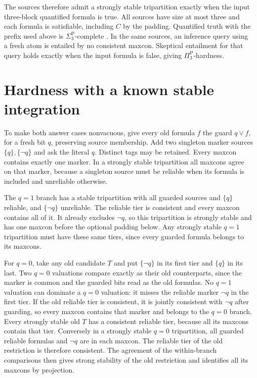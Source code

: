 \documentclass[11pt,a4paper]{amsart}
\begin{document}
The sources therefore admit a strongly stable tripartition exactly
when the input three-block quantified formula is true. All sources
have size at most three and each formula is satisfiable, including
\(C\) by the padding. Quantified truth with the prefix used above
is \(\Sigma_3^{\mathrm P}\)-complete \cite{stockmeyer}. In the
same sources, an inference query using a fresh atom is entailed by
no consistent maxcon. Skeptical entailment for that query holds
exactly when the input formula is false, giving
\(\Pi_3^{\mathrm P}\)-hardness.

\section{Hardness with a known stable integration}

To make both answer cases nonvacuous, give every old formula \(f\)
the guard \(q\lor f\), for a fresh bit \(q\), preserving source
membership. Add two singleton marker sources \(\{q\},\{\neg q\}\)
and ask the literal \(q\). Distinct tags may be retained.
Every maxcon contains exactly one marker. In a strongly stable
tripartition all maxcons agree on that marker, because a singleton
source must be reliable when its formula is included and
unreliable otherwise.

The \(q=1\) branch has a stable tripartition with all guarded
sources and \(\{q\}\) reliable, and \(\{\neg q\}\) unreliable.
The reliable tier is consistent and every maxcon contains all
of it. It already excludes \(\neg q\), so this tripartition is
strongly stable and has one maxcon before the optional padding
below. Any strongly stable \(q=1\) tripartition must have these
same tiers, since every guarded formula belongs to its maxcons.

For \(q=0\), take any old candidate \(T\) and put \(\{\neg q\}\)
in its first tier and \(\{q\}\) in its last. Two \(q=0\)
valuations compare exactly as their old counterparts, since
the marker is common and the guarded bits read as the
old formulas. No \(q=1\) valuation can dominate a \(q=0\)
valuation: it misses the reliable marker \(\neg q\) in the
first tier. If the old reliable tier is consistent, it is
jointly consistent with \(\neg q\) after guarding, so every
maxcon contains that marker and belongs to the \(q=0\) branch.
Every strongly stable old \(T\) has a consistent reliable tier,
because all its maxcons contain that tier. Conversely in a
strongly stable \(q=0\) tripartition, all guarded reliable formulas
and \(\neg q\) are in each maxcon. The reliable tier of the old
restriction is therefore consistent. The agreement of the
within-branch comparisons then gives strong stability of the
old restriction and identifies all its maxcons by projection.
\end{document}
